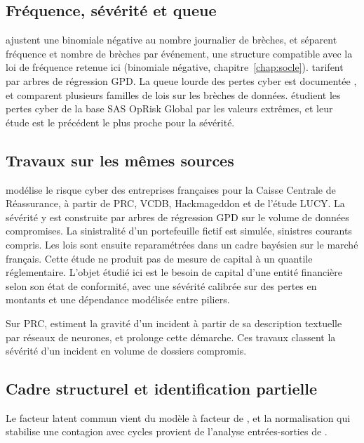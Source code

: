 \subsection*{Fréquence, sévérité et queue}
\citet{Edwards2016} ajustent une binomiale négative au
nombre journalier de brèches, et \citet{LuZhangZhu2024} séparent fréquence et nombre de brèches par
événement, une structure compatible avec la loi de fréquence retenue ici (binomiale négative, chapitre~\ref{chap:socle}). \citet{FarkasLopezThomas2021}
tarifent par arbres de régression GPD. La queue lourde des pertes cyber est documentée
\citep{MaillartSornette2010, wheatley2016}, et \citet{elingloperfido2017} comparent plusieurs
familles de lois sur les brèches de données. \citet{elingwirfs2019} étudient les pertes cyber de la
base SAS OpRisk Global par les valeurs extrêmes, et leur étude est le précédent le plus proche pour la sévérité.

\subsection*{Travaux sur les mêmes sources}
\citet{Ranguin2024} modélise le risque cyber des
entreprises françaises pour la Caisse Centrale de Réassurance, à partir de PRC, VCDB, Hackmageddon et
de l'étude LUCY. La sévérité y est construite par arbres de régression GPD sur le volume de données
compromises. La sinistralité d'un portefeuille fictif est simulée, sinistres courants compris. Les lois
sont ensuite reparamétrées dans un cadre bayésien sur le marché français. Cette étude ne produit pas de
mesure de capital à un quantile réglementaire. L'objet étudié ici est le besoin de capital d'une
entité financière selon son état de conformité, avec une sévérité calibrée sur des pertes en montants
et une dépendance modélisée entre piliers.

Sur PRC, \citet{KherLopezRapior2023} estiment la gravité d'un incident à partir de sa description
textuelle par réseaux de neurones, et \citet{Dountio2026} prolonge cette démarche. Ces travaux
classent la sévérité d'un incident en volume de dossiers compromis.

\subsection*{Cadre structurel et identification partielle}
Le facteur latent commun vient du modèle à facteur de \citet{Vasicek2002}, et la normalisation qui stabilise une contagion avec
cycles provient de l'analyse entrées-sorties de \citet{Leontief1936}.


